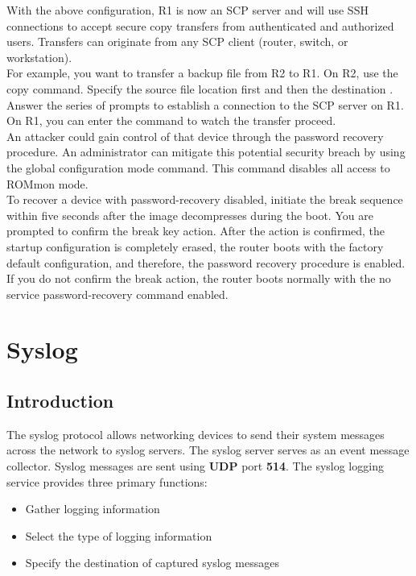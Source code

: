 With the above configuration, R1 is now an SCP server and will use SSH connections to accept secure copy transfers from authenticated and authorized users. Transfers can originate from any SCP client (router, switch, or workstation). \\

For example, you want to transfer a backup file from R2 to R1. On R2, use the copy command. Specify the source file location first  and then the destination . Answer the series of prompts to establish a connection to the SCP server on R1. On R1, you can enter the  command to watch the transfer proceed.\\

An attacker could gain control of that device through the password recovery procedure. An administrator can mitigate this potential security breach by using the  global configuration mode command. This command disables all access to ROMmon mode. \\

To recover a device with password-recovery disabled, initiate the break sequence within five seconds after the image decompresses during the boot. You are prompted to confirm the break key action. After the action is confirmed, the startup configuration is completely erased, the router boots with the factory default configuration, and therefore, the password recovery procedure is enabled. If you do not confirm the break action, the router boots normally with the no service password-recovery command enabled.\\



\section{Syslog}

\subsection{Introduction}

The syslog protocol allows networking devices to send their system messages across the network to syslog servers. The syslog server serves as an event message collector. Syslog messages are sent using \textbf{UDP} port \textbf{514}. The syslog logging service provides three primary functions:

\begin{itemize}
\item Gather logging information
\item Select the type of logging information
\item Specify the destination of captured syslog messages
\end{itemize}

